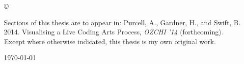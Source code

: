 
\vspace*{14cm}
\begin{center}
  \makeatletter
  \copyright\ \@author
  \makeatother
\end{center}
\noindent
\begin{center}
\end{center}
\noindent

\newpage

\vspace*{7cm}


\begin{center}
	Sections of this thesis are to appear in: Purcell, A., Gardner, H., and Swift, B. 2014. Visualising a Live Coding Arts Process, \textit{OZCHI '14} (forthcoming).\\
	\vspace*{10mm}
	Except where otherwise indicated, this thesis is my own original work.
\end{center}

\vspace*{4cm}

\hspace{8cm}\makeatletter\@author\makeatother\par
\hspace{8cm}\today
